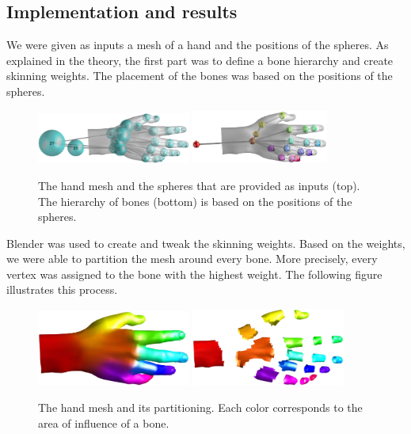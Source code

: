 \documentclass[a4paper,10pt]{article}
\begin{document}
\begin{multicols}{2}
\section{Implementation and results}
\label{section:results}

We were given as inputs a mesh of a hand and the positions of the spheres.
As explained in the theory, the first part was to define a bone hierarchy and create skinning weights.
The placement of the bones was based on the positions of the spheres.

\begin{figure}[H]
\centering
\includegraphics[width=0.45\textwidth]{figs/hand_spheres}
\includegraphics[width=0.40\textwidth]{figs/hand_bones}
\caption{The hand mesh and the spheres that are provided as inputs (top).
The hierarchy of bones (bottom) is based on the positions of the spheres.}
\end{figure}

Blender was used to create and tweak the skinning weights.
Based on the weights, we were able to partition the mesh around every bone.
More precisely, every vertex was assigned to the bone with the highest weight.
The following figure illustrates this process.

\begin{figure}[H]
\centering
\includegraphics[width=0.45\textwidth]{figs/hand_bone_weights}
\includegraphics[width=0.45\textwidth]{figs/hand_bone_partition}
\caption{The hand mesh and its partitioning.
Each color corresponds to the area of influence of a bone.}
\end{figure}


\end{multicols}
\end{document}
